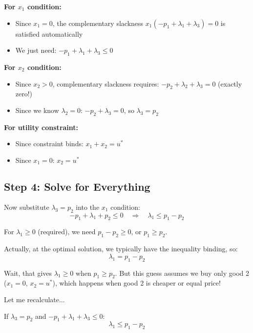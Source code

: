 \documentclass[11pt]{article}
\begin{document}
\textbf{For $x_1$ condition:}
\begin{itemize}
\item Since $x_1 = 0$, the complementary slackness $x_1(-p_1 + \lambda_1 + \lambda_3) = 0$ is satisfied automatically
\item We just need: $-p_1 + \lambda_1 + \lambda_3 \leq 0$
\end{itemize}

\textbf{For $x_2$ condition:}
\begin{itemize}
\item Since $x_2 > 0$, complementary slackness requires: $-p_2 + \lambda_2 + \lambda_3 = 0$ (exactly zero!)
\item Since we know $\lambda_2 = 0$: $-p_2 + \lambda_3 = 0$, so $\lambda_3 = p_2$
\end{itemize}

\textbf{For utility constraint:}
\begin{itemize}
\item Since constraint binds: $x_1 + x_2 = u^*$
\item Since $x_1 = 0$: $x_2 = u^*$
\end{itemize}

\subsection{Step 4: Solve for Everything}

Now substitute $\lambda_3 = p_2$ into the $x_1$ condition:
\begin{equation}
-p_1 + \lambda_1 + p_2 \leq 0 \quad \Rightarrow \quad \lambda_1 \leq p_1 - p_2
\end{equation}

For $\lambda_1 \geq 0$ (required), we need $p_1 - p_2 \geq 0$, or $p_1 \geq p_2$.

Actually, at the optimal solution, we typically have the inequality binding, so:
\begin{equation}
\lambda_1 = p_1 - p_2
\end{equation}

Wait, that gives $\lambda_1 \geq 0$ when $p_1 \geq p_2$. But this guess assumes we buy only good 2 ($x_1 = 0$, $x_2 = u^*$), which happens when good 2 is cheaper or equal price!

Let me recalculate...

If $\lambda_3 = p_2$ and $-p_1 + \lambda_1 + \lambda_3 \leq 0$:
\begin{equation}
\lambda_1 \leq p_1 - p_2
\end{equation}
\end{document}
